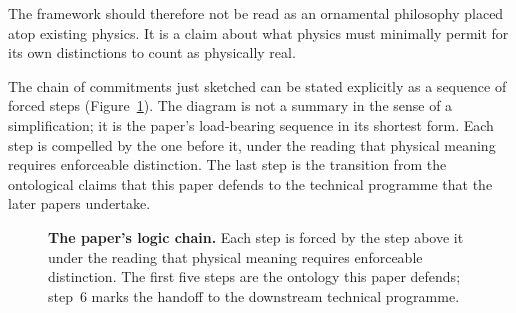 \documentclass[11pt]{article}
\begin{document}
The framework should therefore not be read as an ornamental philosophy placed atop existing physics. It is a claim about what physics must minimally permit for its own distinctions to count as physically real.

The chain of commitments just sketched can be stated explicitly as a sequence of forced steps (Figure~\ref{fig:logic_chain}). The diagram is not a summary in the sense of a simplification; it is the paper's load-bearing sequence in its shortest form. Each step is compelled by the one before it, under the reading that physical meaning requires enforceable distinction. The last step is the transition from the ontological claims that this paper defends to the technical programme that the later papers undertake.

\begin{figure}[ht]
\centering
{}
\caption[The paper's logic chain]{\textbf{The paper's logic chain.} Each step is forced by the step above it under the reading that physical meaning requires enforceable distinction. The first five steps are the ontology this paper defends; step~6 marks the handoff to the downstream technical programme.}
\label{fig:logic_chain}
\end{figure}
\end{document}
